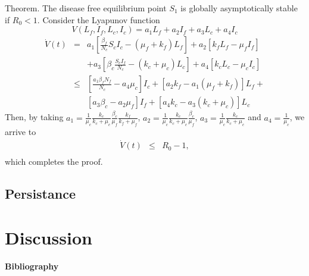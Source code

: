 \documentclass[preprint,12pt]{elsarticle}
\begin{document}
\noindent Theorem. The disease free equilibrium point $S_1$ is globally asymptotically stable if $R_0<1$.
Consider the Lyapunov function
$$V(L_f,I_f,L_c,I_c)=a_1L_f+a_2I_f+a_3L_c+a_4I_c$$
$$
\begin{array}{lll}
\dot{V}(t)&=&a_1\left[\frac{\beta_f}{N_c}S_cI_c-(\mu_f+k_f)L_f\right]+a_2\left[k_fL_f-\mu_fI_f\right]\\
&&+a_3\left[ \beta_c\frac{S_cI_f}{N_c}-(k_c+\mu_c)L_c\right]+a_4\left[k_cL_c-\mu_cI_c\right]\\
&\leq& \left[\frac{a_1\beta_fN_f}{N_c}-a_4\mu_c\right]I_c+\left[a_2k_f-a_1(\mu_f+k_f)\right]L_f+\\
&&\left[a_3\beta_c-a_2\mu_f\right]I_f+\left[a_4k_c-a_3(k_c+\mu_c)\right]L_c
\end{array}
$$
Then, by taking $a_1=\frac{1}{\mu_c}\frac{k_c}{k_c+\mu_c}\frac{\beta_c}{\mu_f}\frac{k_f}{k_f+\mu_f}$, $a_2=\frac{1}{\mu_c}\frac{k_c}{k_c+\mu_c}\frac{\beta_c}{\mu_f}$, $a_3=\frac{1}{\mu_c}\frac{k_c}{k_c+\mu_c}$ and $a_4=\frac{1}{\mu_c}$, we arrive to
$$
\begin{array}{lll}
\dot{V}(t)&\leq& R_0-1,\\
\end{array}
$$
which completes the proof.

\subsection{Persistance}

\section{Discussion}



\textbf{Bibliography}


\end{document}

